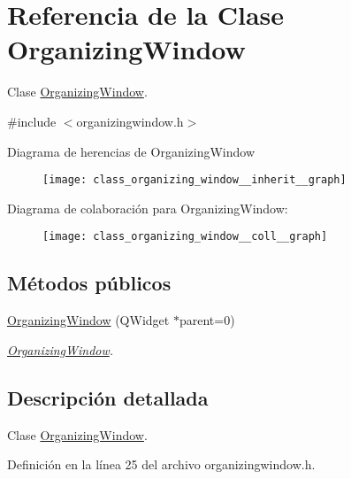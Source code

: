 \hypertarget{class_organizing_window}{}\section{Referencia de la Clase Organizing\+Window}
\label{class_organizing_window}


Clase \hyperlink{class_organizing_window}{Organizing\+Window}.  




{\ttfamily \#include $<$organizingwindow.\+h$>$}



Diagrama de herencias de Organizing\+Window\nopagebreak
\begin{figure}[H]
\begin{center}
\leavevmode
\texttt{[image: class\_organizing\_window\_\_inherit\_\_graph]}
\end{center}
\end{figure}


Diagrama de colaboración para Organizing\+Window\+:\nopagebreak
\begin{figure}[H]
\begin{center}
\leavevmode
\texttt{[image: class\_organizing\_window\_\_coll\_\_graph]}
\end{center}
\end{figure}
\subsection*{Métodos públicos}
\begin{DoxyCompactItemize}
\item 
\hyperlink{class_organizing_window_ae1cc436971abebbed7105b7f072576aa}{Organizing\+Window} (Q\+Widget $\ast$parent=0)
\begin{DoxyCompactList}\small\item\em \hyperlink{class_organizing_window}{Organizing\+Window}. \end{DoxyCompactList}\end{DoxyCompactItemize}


\subsection{Descripción detallada}
Clase \hyperlink{class_organizing_window}{Organizing\+Window}. 

Definición en la línea 25 del archivo organizingwindow.\+h.



